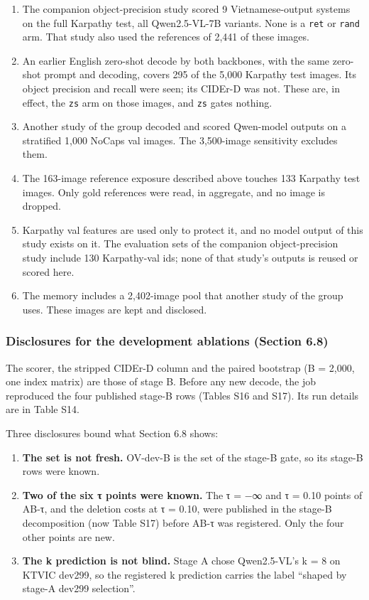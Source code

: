 \documentclass[manuscript,screen]{acmart}
\providecommand{\tightlist}{\setlength{\itemsep}{0pt}\setlength{\parskip}{0pt}}
\begin{document}
\begin{enumerate}
\def\labelenumi{\arabic{enumi}.}
\tightlist
\item
  The companion object-precision study scored 9 Vietnamese-output systems on the full Karpathy test,
  all Qwen2.5-VL-7B variants. None is a \texttt{ret} or \texttt{rand} arm. That study also used the
  references of 2,441 of these images.
\item
  An earlier English zero-shot decode by both backbones, with the same zero-shot prompt and
  decoding, covers 295 of the 5,000 Karpathy test images. Its object precision and recall were seen;
  its CIDEr-D was not. These are, in effect, the \texttt{zs} arm on those images, and \texttt{zs}
  gates nothing.
\item
  Another study of the group decoded and scored Qwen-model outputs on a stratified 1,000 NoCaps val
  images. The 3,500-image sensitivity excludes them.
\item
  The 163-image reference exposure described above touches 133 Karpathy test images. Only gold
  references were read, in aggregate, and no image is dropped.
\item
  Karpathy val features are used only to protect it, and no model output of this study exists on it.
  The evaluation sets of the companion object-precision study include 130 Karpathy-val ids; none of
  that study's outputs is reused or scored here.
\item
  The memory includes a 2,402-image pool that another study of the group uses. These images are kept
  and disclosed.
\end{enumerate}

\subsubsection{Disclosures for the development ablations (Section
6.8)}\label{disclosures-for-the-development-ablations-section-6.8}

The scorer, the stripped CIDEr-D column and the paired bootstrap (B = 2,000, one index matrix) are
those of stage B. Before any new decode, the job reproduced the four published stage-B rows (Tables
S16 and S17). Its run details are in Table S14.

Three disclosures bound what Section 6.8 shows:

\begin{enumerate}
\def\labelenumi{\arabic{enumi}.}
\tightlist
\item
  \textbf{The set is not fresh.} OV-dev-B is the set of the stage-B gate, so its stage-B rows were
  known.
\item
  \textbf{Two of the six τ points were known.} The τ = −∞ and τ = 0.10 points of AB-τ, and the
  deletion costs at τ = 0.10, were published in the stage-B decomposition (now Table S17) before
  AB-τ was registered. Only the four other points are new.
\item
  \textbf{The k prediction is not blind.} Stage A chose Qwen2.5-VL's k = 8 on KTVIC dev299, so the
  registered k prediction carries the label ``shaped by stage-A dev299 selection''.
\end{enumerate}
\end{document}

